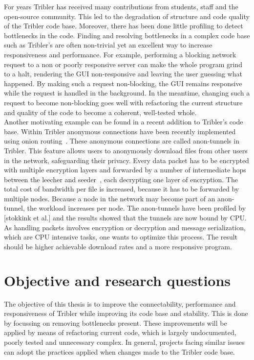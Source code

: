 For years Tribler has received many contributions from students, staff and the open-source community.
This led to the degradation of structure and code quality of the Tribler code base.
Moreover, there has been done little profiling to detect bottlenecks in the code.
Finding and resolving bottlenecks in a complex code base such as Tribler's are often non-trivial yet an excellent way to increase responsiveness and performance.
For example, performing a blocking network request to a non or poorly responsive server can make the whole program grind to a halt, rendering the GUI non-responsive and leaving the user guessing what happened.
By making such a request non-blocking, the GUI remains responsive while the request is handled in the background.
In the meantime, changing such a request to become non-blocking goes well with refactoring the current structure and quality of the code to become a coherent, well-tested whole.\\

Another motivating example can be found in a recent addition to Tribler's code base.
Within Tribler anonymous connections have been recently implemented using onion routing~\cite{Plak-anonymous,ruigrok-anonymous,tanaskoski-anonymous}.
These anonymous connections are called anon-tunnels in Tribler.
This feature allows users to anonymously download files from other users in the network, safeguarding their privacy.
Every data packet has to be encrypted with multiple encryption layers and forwarded by a number of intermediate hops between the leecher and seeder~\cite{Plak-anonymous,tanaskoski-anonymous}, each decrypting one layer of encryption.
The total cost of bandwidth per file is increased, because it has to be forwarded by multiple nodes.
Because a node in the network may become part of an anon-tunnel, the workload increases per node.
The anon-tunnels have been profiled by [stokkink et al.]  and the results showed that the tunnels are now bound by CPU.
As handling packets involves encryption or decryption and message serialization, which are CPU intensive tasks, one wants to optimize this process.
The result should be higher achievable download rates and a more responsive program.


\section{Objective and research questions}
\label{chp1:sct:objectives-research-questions}
The objective of this thesis is to improve the connectability, performance and responsiveness of Tribler while improving its code base and stability. 
This is done by focussing on removing bottlenecks present.
These improvements will be applied by means of refactoring current code, which is largely undocumented, poorly tested and unnecessary complex.
In general, projects facing similar issues can adopt the practices applied when changes made to the Tribler code base.\\

